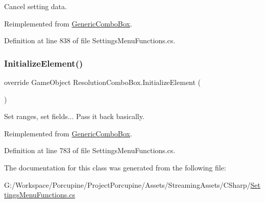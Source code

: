 Cancel setting data. 



Reimplemented from \hyperlink{class_generic_combo_box_a0949a84cf1e33d13346cb90597e005ce}{Generic\+Combo\+Box}.



Definition at line 838 of file Settings\+Menu\+Functions.\+cs.

\mbox{\label{class_resolution_combo_box_a226f4bbab7c3729cb67a681b4adaec3d}} 
\subsubsection{\texorpdfstring{Initialize\+Element()}{InitializeElement()}}
{\footnotesize\ttfamily override Game\+Object Resolution\+Combo\+Box.\+Initialize\+Element (\begin{DoxyParamCaption}{ }\end{DoxyParamCaption})\hspace{0.3cm}{\ttfamily [virtual]}}



Set ranges, set fields... Pass it back basically. 



Reimplemented from \hyperlink{class_generic_combo_box_ae1800a7c68d3af046a2b147e117437ff}{Generic\+Combo\+Box}.



Definition at line 783 of file Settings\+Menu\+Functions.\+cs.



The documentation for this class was generated from the following file\+:\begin{DoxyCompactItemize}
\item 
G\+:/\+Workspace/\+Porcupine/\+Project\+Porcupine/\+Assets/\+Streaming\+Assets/\+C\+Sharp/\hyperlink{_settings_menu_functions_8cs}{Settings\+Menu\+Functions.\+cs}\end{DoxyCompactItemize}
